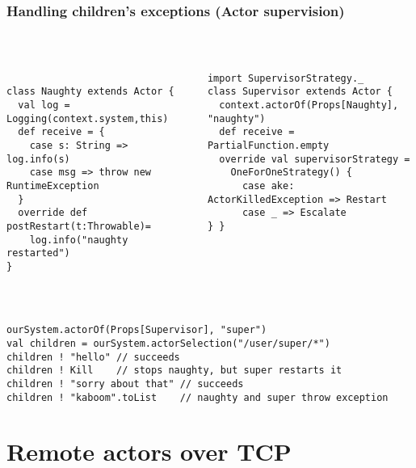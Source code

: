 \documentclass[aspectratio=169]{beamer}
\begin{document}
\begin{frame}[fragile]\frametitle{Handling children's exceptions (Actor supervision)}
~\\[-10mm]
\begin{columns}[t]
\begin{column}{0.54\textwidth}
\begin{lstlisting}[emph={Actor, Logging, Props, ourSystem,terminate,sleep,actorOf,receive, watch,stop,Terminated}]

class Naughty extends Actor {
  val log = Logging(context.system,this)
  def receive = {
    case s: String => log.info(s)
    case msg => throw new RuntimeException
  }
  override def postRestart(t:Throwable)=
    log.info("naughty restarted")
}
\end{lstlisting}
\end{column}
\begin{column}{0.50\textwidth}
\begin{lstlisting}[emph={Actor, Logging, Props, ourSystem,terminate,sleep,actorOf,receive,become,stop,supervisorStrategy}]
import SupervisorStrategy._
class Supervisor extends Actor {
  context.actorOf(Props[Naughty], "naughty")
  def receive = PartialFunction.empty
  override val supervisorStrategy =
    OneForOneStrategy() {
      case ake: ActorKilledException => Restart
      case _ => Escalate
} }
\end{lstlisting}
\end{column}
\end{columns}
~\\[-4pt]
\begin{lstlisting}[emph={Actor, Logging, Props, ourSystem,terminate,sleep,actorOf,receive,become,stop}]
ourSystem.actorOf(Props[Supervisor], "super")
val children = ourSystem.actorSelection("/user/super/*")
children ! "hello" // succeeds
children ! Kill    // stops naughty, but super restarts it
children ! "sorry about that" // succeeds
children ! "kaboom".toList    // naughty and super throw exception
\end{lstlisting}
\end{frame}


\section{Remote actors over TCP}
\end{document}
